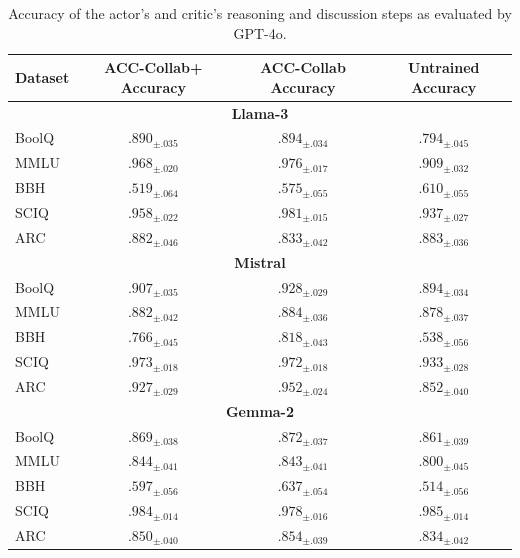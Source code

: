 \begin{table}[h]
    \centering
    \begin{tabular}{l|ccc}
        \toprule
        Dataset & ACC-Collab+ Accuracy & ACC-Collab Accuracy & Untrained Accuracy \\
        \midrule
        \multicolumn{4}{c}{\textbf{Llama-3}} \\
        \hline
        BoolQ & $.890_{\pm .035}$ & $.894_{\pm .034}$ & $.794_{\pm .045}$ \\
        MMLU & $.968_{\pm .020}$ & $.976_{\pm .017}$ & $.909_{\pm .032}$ \\
        BBH & $.519_{\pm .064}$ & $.575_{\pm .055}$ & $.610_{\pm .055}$ \\
        SCIQ & $.958_{\pm .022}$ & $.981_{\pm .015}$ & $.937_{\pm .027}$ \\
        ARC & $.882_{\pm .046}$ & $.833_{\pm .042}$ & $.883_{\pm .036}$ \\
        \midrule
        \multicolumn{4}{c}{\textbf{Mistral}} \\
        \hline
        BoolQ & $.907_{\pm .035}$ & $.928_{\pm .029}$ & $.894_{\pm .034}$ \\
        MMLU & $.882_{\pm .042}$ & $.884_{\pm .036}$ & $.878_{\pm .037}$ \\
        BBH & $.766_{\pm .045}$ & $.818_{\pm .043}$ & $.538_{\pm .056}$ \\
        SCIQ & $.973_{\pm .018}$ & $.972_{\pm .018}$ & $.933_{\pm .028}$ \\
        ARC & $.927_{\pm .029}$ & $.952_{\pm .024}$ & $.852_{\pm .040}$ \\
        \midrule
        \multicolumn{4}{c}{\textbf{Gemma-2}} \\
        \hline
        BoolQ & $.869_{\pm .038}$ & $.872_{\pm .037}$ & $.861_{\pm .039}$ \\
        MMLU & $.844_{\pm .041}$ & $.843_{\pm .041}$ & $.800_{\pm .045}$ \\
        BBH & $.597_{\pm .056}$ & $.637_{\pm .054}$ & $.514_{\pm .056}$ \\
        SCIQ & $.984_{\pm .014}$ & $.978_{\pm .016}$ & $.985_{\pm .014}$ \\
        ARC & $.850_{\pm .040}$ & $.854_{\pm .039}$ & $.834_{\pm .042}$ \\
        \bottomrule
    \end{tabular}
    \caption{Accuracy of the actor's and critic's reasoning and discussion steps as evaluated by GPT-4o.}
    \label{tab:accuracy_comparison}
\end{table}




